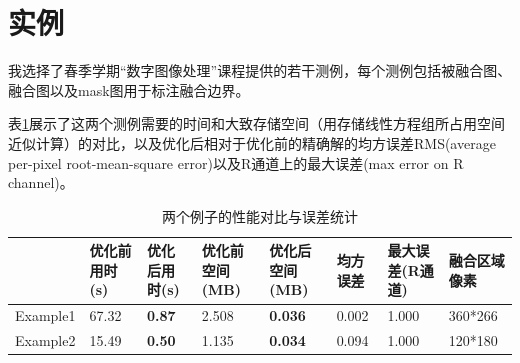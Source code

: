 \documentclass[UTF8, onecolumn, a4paper]{article}
\begin{document}
\section{实例}
我选择了春季学期“数字图像处理”课程提供的若干测例，每个测例包括被融合图、融合图以及mask图用于标注融合边界。

表\ref{table:table1}展示了这两个测例需要的时间和大致存储空间（用存储线性方程组所占用空间近似计算）的对比，以及优化后相对于优化前的精确解的均方误差RMS(average per-pixel root-mean-square error)以及R通道上的最大误差(max error on R channel)。

\begin{table}[h]
	\centering
	\caption{两个例子的性能对比与误差统计}
	\label{table:table1}
	\begin{tabular}{c|p{1.3cm}p{1.3cm}p{1.5cm}p{1.5cm}p{1.5cm}p{1.5cm}p{1.3cm}}
	\toprule
	& 优化前用时(s) & 优化后用时(s) & 优化前空间(MB) & 优化后空间(MB) & 均方误差 & 最大误差(R通道) & 融合区域像素 \\
	\midrule
	Example1 & 67.32 & \textbf{0.87} & 2.508 & \textbf{0.036} & 0.002 & 1.000 & 360*266 \\
	\hline
	Example2 & 15.49 & \textbf{0.50} & 1.135 & \textbf{0.034} & 0.094 & 1.000 & 120*180 \\
	\bottomrule
	\end{tabular}
\end{table}
\end{document}

